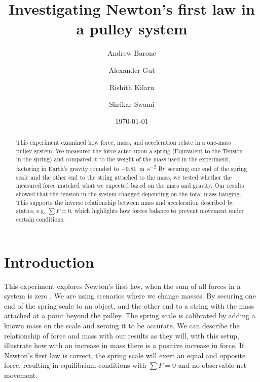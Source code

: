 \documentclass[reprint,amsmath,amssymb,aps,twoside]{revtex4-2}
\begin{document}
\setcounter{page}{9}
\title{Investigating Newton's first law in a pulley system}
\author{Andrew Barone}
\author{Alexander Gut}
\author{Rishith Kilaru}
\author{Shrikar Swami}
\date{\today}

\begin{abstract}
This experiment examined how force, mass, and acceleration relate in a one-mass pulley system. We measured the force acted upon a spring (Equivalent to the Tension in the spring) and compared it to the weight of the mass used in the experiment, factoring in Earth's gravity rounded to \qty{-9.81}{\meter\per\second\squared} By securing one end of the spring scale and the other end to the string attached to the mass, we tested whether the measured force matched what we expected based on the mass and gravity. Our results showed that the tension in the system changed depending on the total mass hanging. This supports the inverse relationship between mass and acceleration described by statics, e.g. $\sum F = 0$, which highlights how forces balance to prevent movement under certain conditions. 
\end{abstract}


\maketitle\thispagestyle{mytitlepage}
    
\section{Introduction}
This experiment explores Newton's first law, when the sum of all forces in a system is zero \cite{tipler, barrons}. We are using scenarios where we change masses. By securing one end of the spring scale to an object, and the other end to a string with the mass attached at a point beyond the pulley. The spring scale is calibrated by adding a known mass on the scale and zeroing it to be accurate. We can describe the relationship of force and mass with our results as they will, with this setup, illustrate how with an increase in mass there is a positive increase in force. If Newton's first law is correct, the spring scale will exert an equal and opposite force, resulting in equilibrium conditions with $\sum F = 0$ and no observable net movement.
    
\end{document}
